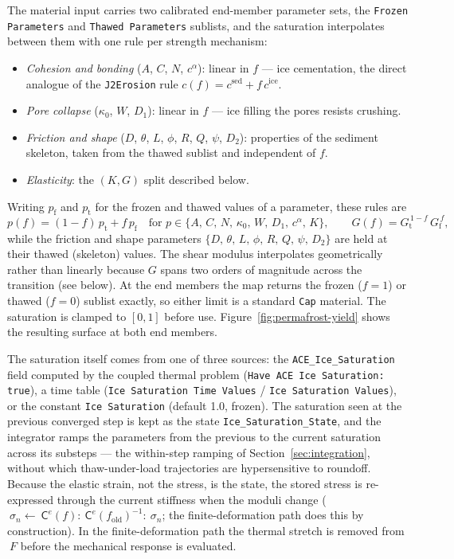 \documentclass[12pt]{article}
\newcommand{\stress}{~\sigma}
\newcommand{\Fdef}{~F}
\newcommand{\Celast}{{~{\mathsf C}^e}}
\begin{document}
The material input carries two calibrated end-member parameter sets,
the \texttt{Frozen Parameters} and \texttt{Thawed Parameters}
sublists, and the saturation interpolates between them with one
rule per strength mechanism:
\begin{itemize}
\item \emph{Cohesion and bonding} ($A$, $C$, $N$, $c^\alpha$):
  linear in $f$ --- ice cementation, the direct analogue of the
  \texttt{J2Erosion} rule
  $c(f) = c^{\mathrm{sed}} + f\,c^{\mathrm{ice}}$.
\item \emph{Pore collapse} ($\kappa_0$, $W$, $D_1$): linear in $f$
  --- ice filling the pores resists crushing.
\item \emph{Friction and shape} ($D$, $\theta$, $L$, $\phi$, $R$,
  $Q$, $\psi$, $D_2$): properties of the sediment skeleton, taken
  from the thawed sublist and independent of $f$.
\item \emph{Elasticity}: the $(K, G)$ split described below.
\end{itemize}
Writing $p_{\mathrm f}$ and $p_{\mathrm t}$ for the frozen and thawed
values of a parameter, these rules are
\begin{equation*}
  p(f) = (1-f)\,p_{\mathrm t} + f\,p_{\mathrm f}
  \quad\text{for } p \in \{A,\,C,\,N,\,\kappa_0,\,W,\,D_1,\,c^\alpha,\,K\},
  \qquad
  G(f) = G_{\mathrm t}^{\,1-f}\,G_{\mathrm f}^{\,f},
\end{equation*}
while the friction and shape parameters
$\{D,\,\theta,\,L,\,\phi,\,R,\,Q,\,\psi,\,D_2\}$ are held at their
thawed (skeleton) values. The shear modulus interpolates geometrically
rather than linearly because $G$ spans two orders of magnitude across
the transition (see below). At the end members the map returns the
frozen ($f = 1$) or thawed ($f = 0$) sublist exactly, so either limit
is a standard \texttt{Cap} material. The saturation is clamped to
$[0, 1]$ before use. Figure~\ref{fig:permafrost-yield} shows the
resulting surface at both end members.

The saturation itself comes from one of three sources: the
\texttt{ACE\_Ice\_Saturation} field computed by the coupled thermal
problem (\texttt{Have ACE Ice Saturation: true}), a time table
(\texttt{Ice Saturation Time Values} / \texttt{Ice Saturation
Values}), or the constant \texttt{Ice Saturation} (default 1.0,
frozen). The saturation seen at the previous converged step is kept
as the state \texttt{Ice\_Saturation\_State}, and the integrator
ramps the parameters from the previous to the current saturation
across its substeps --- the within-step ramping of
Section~\ref{sec:integration}, without which thaw-under-load
trajectories are hypersensitive to roundoff. Because the elastic
strain, not the stress, is the state, the stored stress is
re-expressed through the current stiffness when the moduli change
($\stress_n \leftarrow \Celast(f) : \Celast(f_{\mathrm{old}})^{-1}
: \stress_n$; the finite-deformation path does this by construction).
In the finite-deformation path the thermal stretch is removed from
$\Fdef$ before the mechanical response is evaluated.
\end{document}
